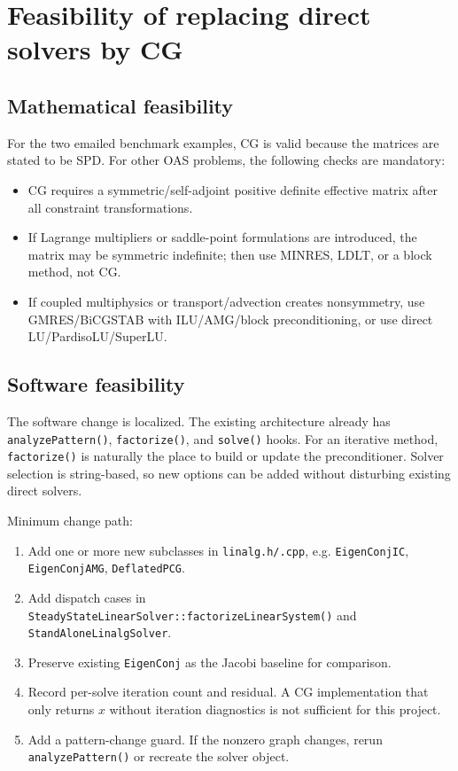 \documentclass[10pt,a4paper]{article}
\newcommand{\code}[1]{\texttt{#1}}
\begin{document}
\section{Feasibility of replacing direct solvers by CG}

\subsection*{Mathematical feasibility}

For the two emailed benchmark examples, CG is valid because the matrices are stated to be SPD. For other OAS problems, the following checks are mandatory:
\begin{itemize}
  \item CG requires a symmetric/self-adjoint positive definite effective matrix after all constraint transformations.
  \item If Lagrange multipliers or saddle-point formulations are introduced, the matrix may be symmetric indefinite; then use MINRES, LDLT, or a block method, not CG.
  \item If coupled multiphysics or transport/advection creates nonsymmetry, use GMRES/BiCGSTAB with ILU/AMG/block preconditioning, or use direct LU/PardisoLU/SuperLU.
\end{itemize}

\subsection*{Software feasibility}

The software change is localized. The existing architecture already has \code{analyzePattern()}, \code{factorize()}, and \code{solve()} hooks. For an iterative method, \code{factorize()} is naturally the place to build or update the preconditioner. Solver selection is string-based, so new options can be added without disturbing existing direct solvers.

Minimum change path:
\begin{enumerate}
  \item Add one or more new subclasses in \code{linalg.h/.cpp}, e.g. \code{EigenConjIC}, \code{EigenConjAMG}, \code{DeflatedPCG}.
  \item Add dispatch cases in \code{SteadyStateLinearSolver::factorizeLinearSystem()} and \code{StandAloneLinalgSolver}.
  \item Preserve existing \code{EigenConj} as the Jacobi baseline for comparison.
  \item Record per-solve iteration count and residual. A CG implementation that only returns \(x\) without iteration diagnostics is not sufficient for this project.
  \item Add a pattern-change guard. If the nonzero graph changes, rerun \code{analyzePattern()} or recreate the solver object.
\end{enumerate}
\end{document}
